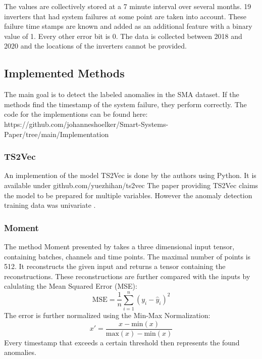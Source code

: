 The values are collectively stored at a 7 minute interval over several months. 19 inverters that had system failures at some point are taken into account. These failure time stamps are known and added as an additional feature with a binary value of 1. Every other error bit is 0. The data is collected between 2018 and 2020 and the locations of the inverters cannot be provided.


\subsection{Implemented Methods}
The main goal is to detect the labeled anomalies in the SMA dataset. If the methods find the timestamp of the system failure, they perform correctly.
The code for the implementions can be found here: https://github.com/johanneshoelker/Smart-Systems-Paper/tree/main/Implementation


%

\subsubsection{TS2Vec}
An implemention of the model TS2Vec is done by the authors using Python. It is available under github.com/yuezhihan/ts2vec
The paper providing TS2Vec claims the model to be prepared for multiple variables. However the anomaly detection training data was univariate \cite{yue_ts2vec_2022}.

\subsubsection{Moment}
The method Moment presented by \cite{goswami_moment_2024} takes a three dimensional input tensor, containing batches, channels and time points. The maximal number of points is 512. It reconstructs the given input and returns a tensor containing the reconstructions. These reconstructions are further compared with the inputs by calulating the Mean Squared Error (MSE):
\begin{equation}
    \text{MSE} = \frac{1}{n} \sum_{i=1}^{n} \left( y_i - \hat{y}_i \right)^2
\end{equation}
The error is further normalized using the Min-Max Normalization:
\begin{equation}
x' = \frac{x - \text{min}(x)}{\text{max}(x) - \text{min}(x)}
\end{equation}
Every timestamp that exceeds a certain threshold then represents the found anomalies.

